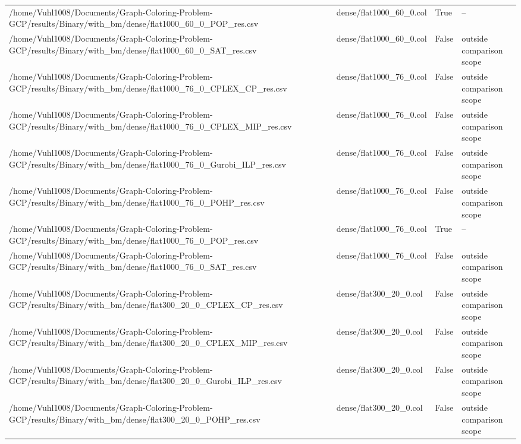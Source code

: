 \begin{table}[htbp]
\begin{tabular}{llll}
/home/Vuhl1008/Documents/Graph-Coloring-Problem-GCP/results/Binary/with\_bm/dense/flat1000\_60\_0\_POP\_res.csv & dense/flat1000\_60\_0.col & True & -- \\
/home/Vuhl1008/Documents/Graph-Coloring-Problem-GCP/results/Binary/with\_bm/dense/flat1000\_60\_0\_SAT\_res.csv & dense/flat1000\_60\_0.col & False & outside comparison scope \\
/home/Vuhl1008/Documents/Graph-Coloring-Problem-GCP/results/Binary/with\_bm/dense/flat1000\_76\_0\_CPLEX\_CP\_res.csv & dense/flat1000\_76\_0.col & False & outside comparison scope \\
/home/Vuhl1008/Documents/Graph-Coloring-Problem-GCP/results/Binary/with\_bm/dense/flat1000\_76\_0\_CPLEX\_MIP\_res.csv & dense/flat1000\_76\_0.col & False & outside comparison scope \\
/home/Vuhl1008/Documents/Graph-Coloring-Problem-GCP/results/Binary/with\_bm/dense/flat1000\_76\_0\_Gurobi\_ILP\_res.csv & dense/flat1000\_76\_0.col & False & outside comparison scope \\
/home/Vuhl1008/Documents/Graph-Coloring-Problem-GCP/results/Binary/with\_bm/dense/flat1000\_76\_0\_POHP\_res.csv & dense/flat1000\_76\_0.col & False & outside comparison scope \\
/home/Vuhl1008/Documents/Graph-Coloring-Problem-GCP/results/Binary/with\_bm/dense/flat1000\_76\_0\_POP\_res.csv & dense/flat1000\_76\_0.col & True & -- \\
/home/Vuhl1008/Documents/Graph-Coloring-Problem-GCP/results/Binary/with\_bm/dense/flat1000\_76\_0\_SAT\_res.csv & dense/flat1000\_76\_0.col & False & outside comparison scope \\
/home/Vuhl1008/Documents/Graph-Coloring-Problem-GCP/results/Binary/with\_bm/dense/flat300\_20\_0\_CPLEX\_CP\_res.csv & dense/flat300\_20\_0.col & False & outside comparison scope \\
/home/Vuhl1008/Documents/Graph-Coloring-Problem-GCP/results/Binary/with\_bm/dense/flat300\_20\_0\_CPLEX\_MIP\_res.csv & dense/flat300\_20\_0.col & False & outside comparison scope \\
/home/Vuhl1008/Documents/Graph-Coloring-Problem-GCP/results/Binary/with\_bm/dense/flat300\_20\_0\_Gurobi\_ILP\_res.csv & dense/flat300\_20\_0.col & False & outside comparison scope \\
/home/Vuhl1008/Documents/Graph-Coloring-Problem-GCP/results/Binary/with\_bm/dense/flat300\_20\_0\_POHP\_res.csv & dense/flat300\_20\_0.col & False & outside comparison scope \\

\end{tabular}
\end{table}
